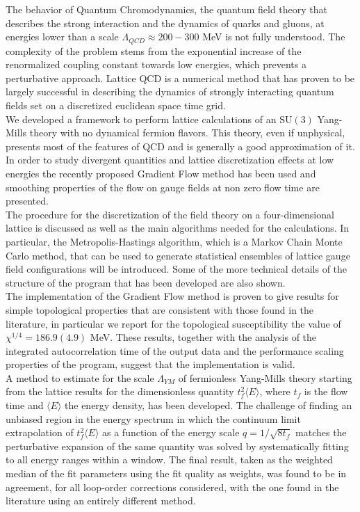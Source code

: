 The behavior of Quantum Chromodynamics, the quantum field theory that describes the strong interaction and the dynamics of quarks and gluons, at energies lower than a scale $\Lambda_{QCD} \approx 200-300$ MeV is not fully understood. The complexity of the problem stems from the exponential increase of the renormalized coupling constant towards low energies, which prevents a perturbative approach. Lattice QCD is a numerical method that has proven to be largely successful in describing the dynamics of strongly interacting quantum fields set on a discretized euclidean space time grid.\\

We developed a framework to perform lattice calculations of an $\mathrm{SU}(3)$ Yang-Mills theory with no dynamical fermion flavors. This theory, even if unphysical, presents most of the features of QCD and is generally a good approximation of it. In order to study divergent quantities and lattice discretization effects at low energies the recently proposed Gradient Flow method \cite{luscher_properties_2010} has been used and smoothing properties of the flow on gauge fields at non zero flow time are presented. \\
The procedure for the discretization of the field theory on a four-dimensional lattice is discussed as well as the main algorithms needed for the calculations. In particular, the Metropolis-Hastings algorithm, which is a Markov Chain Monte Carlo method, that can be used to generate statistical ensembles of lattice gauge field configurations will be introduced. Some of the more technical details of the structure of the program that has been developed are also shown.\\

The implementation of the Gradient Flow method is proven to give results for simple topological properties that are consistent with those found in the literature, in particular we report for the topological susceptibility the value of $\chi^{1/4} = 186.9(4.9)$ MeV. These results, together with the analysis of the integrated autocorrelation time of the output data and the performance scaling properties of the program, suggest that the implementation is valid.\\
A method to estimate for the scale $\Lambda_{YM}$ of fermionless Yang-Mills theory starting from the lattice results for the dimensionless quantity $t_f^2\langle E \rangle$, where $t_f$ is the flow time and $\langle E \rangle$ the energy density, has been developed. The challenge of finding an unbiased region in the energy spectrum in which the continuum limit extrapolation of $t_f^2\langle E \rangle$ as a function of the energy scale $q=1/\sqrt{8t_f}$ matches the perturbative expansion of the same quantity was solved by systematically fitting to all energy ranges within a window. The final result, taken as the weighted median of the fit parameters using the fit quality as weights, was found to be in agreement, for all loop-order corrections considered, with the one found in the literature \cite{capitani_non-perturbative_1999} using an entirely different method.
